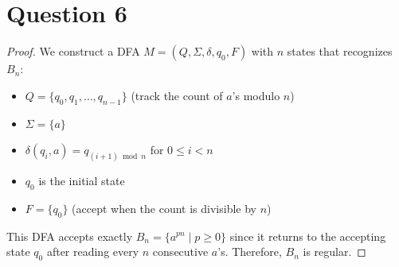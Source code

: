 \documentclass[a4paper, UTF-8]{article}
\theoremstyle{plain}
\begin{document}
\section{Question 6} 

\begin{proof}
We construct a DFA $M = (Q, \Sigma, \delta, q_0, F)$ with $n$ states that recognizes $B_n$:

\begin{itemize}
    \item $Q = \{q_0, q_1, \ldots, q_{n-1}\}$ (track the count of $a$'s modulo $n$)
    \item $\Sigma = \{a\}$
    \item $\delta(q_i, a) = q_{(i+1) \bmod n}$ for $0 \leq i < n$
    \item $q_0$ is the initial state
    \item $F = \{q_0\}$ (accept when the count is divisible by $n$)
\end{itemize}

\begin{center}
\end{center}

This DFA accepts exactly $B_n = \{a^{pn} \mid p \geq 0\}$ since it returns to the accepting state $q_0$ after reading every $n$ consecutive $a$'s. Therefore, $B_n$ is regular.
\end{proof}
\end{document}

